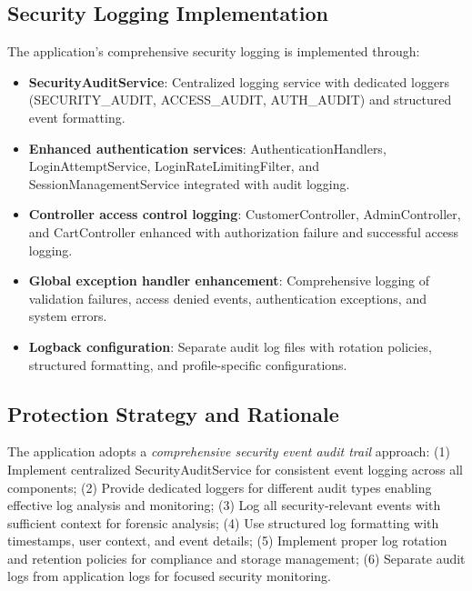 \documentclass[]{UCD_CS_FYP_Report}
\begin{document}
\subsection{Security Logging Implementation}
The application's comprehensive security logging is implemented through:
\begin{itemize}
	\item \textbf{SecurityAuditService}: Centralized logging service with dedicated loggers (SECURITY\_AUDIT, ACCESS\_AUDIT, AUTH\_AUDIT) and structured event formatting.
	\item \textbf{Enhanced authentication services}: AuthenticationHandlers, LoginAttemptService, LoginRateLimitingFilter, and SessionManagementService integrated with audit logging.
	\item \textbf{Controller access control logging}: CustomerController, AdminController, and CartController enhanced with authorization failure and successful access logging.
	\item \textbf{Global exception handler enhancement}: Comprehensive logging of validation failures, access denied events, authentication exceptions, and system errors.
	\item \textbf{Logback configuration}: Separate audit log files with rotation policies, structured formatting, and profile-specific configurations.
\end{itemize}

\subsection{Protection Strategy and Rationale}
The application adopts a \textit{comprehensive security event audit trail} approach: (1) Implement centralized SecurityAuditService for consistent event logging across all components; (2) Provide dedicated loggers for different audit types enabling effective log analysis and monitoring; (3) Log all security-relevant events with sufficient context for forensic analysis; (4) Use structured log formatting with timestamps, user context, and event details; (5) Implement proper log rotation and retention policies for compliance and storage management; (6) Separate audit logs from application logs for focused security monitoring.
\end{document}
